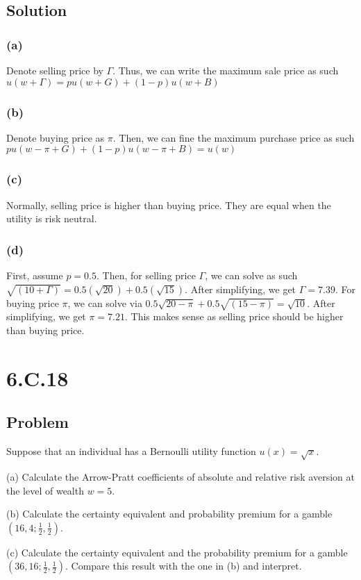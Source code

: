 \documentclass[10pt, a4paper]{article}
\begin{document}
    \subsection*{Solution}
      \subsubsection*{(a)}
        Denote selling price by $\Gamma$. Thus, we can write the maximum sale price as such $u(w+\Gamma) = pu(w+G) + (1-p)u(w+B)$
      \subsubsection*{(b)}
        Denote buying price as $\pi$. Then, we can fine the maximum purchase price as such $pu(w-\pi+G)+(1-p)u(w-\pi+B) = u(w)$
      \subsubsection*{(c)}
        Normally, selling price is higher than buying price. They are equal when the utility is risk neutral.
      \subsubsection*{(d)}
        First, assume $p=0.5$. Then, for selling price $\Gamma$, we can solve as such $\sqrt{(10+\Gamma)}=0.5(\sqrt{20}) + 0.5(\sqrt{15})$. After simplifying, we get $\Gamma = 7.39$. For buying price $\pi$, we can solve via $0.5\sqrt{20-\pi}+0.5\sqrt{(15-\pi)} = \sqrt{10}$. After simplifying, we get $\pi = 7.21$. This makes sense as selling price should be higher than buying price. 
  \section*{6.C.18}
    \subsection*{Problem}
      Suppose that an individual has a Bernoulli utility function $u(x) = \sqrt{x}$.

      (a) Calculate the Arrow-Pratt coefficients of absolute and relative risk aversion at the level of wealth $w=5$.

      (b) Calculate the certainty equivalent and probability premium for a gamble $(16,4;\frac{1}{2},\frac{1}{2})$.

      (c) Calculate the certainty equivalent and the probability premium for a gamble $(36, 16; \frac{1}{2}, \frac{1}{2})$. Compare this result with the one in (b) and interpret.
\end{document}
